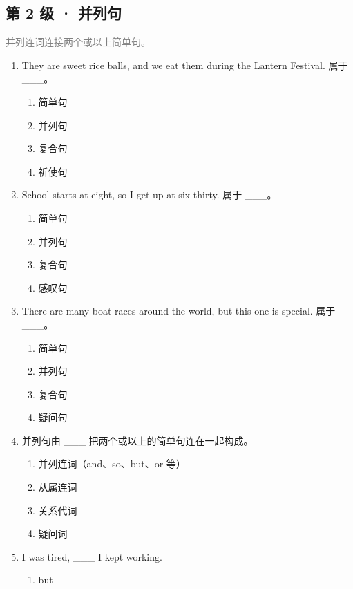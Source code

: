\documentclass[11pt,a4paper]{ctexart}
\begin{document}
\subsection*{第 2 级 · 并列句}
\noindent\textcolor{gray}{并列连词连接两个或以上简单句。}\par\smallskip
\begin{enumerate}[leftmargin=*,itemsep=4pt]
\item They are sweet rice balls, and we eat them during the Lantern Festival. 属于 \_\_\_。
\begin{enumerate}[label=\Alph*.,leftmargin=2em,itemsep=1pt,topsep=2pt]
\item 简单句
\item 并列句
\item 复合句
\item 祈使句
\end{enumerate}
\item School starts at eight, so I get up at six thirty. 属于 \_\_\_。
\begin{enumerate}[label=\Alph*.,leftmargin=2em,itemsep=1pt,topsep=2pt]
\item 简单句
\item 并列句
\item 复合句
\item 感叹句
\end{enumerate}
\item There are many boat races around the world, but this one is special. 属于 \_\_\_。
\begin{enumerate}[label=\Alph*.,leftmargin=2em,itemsep=1pt,topsep=2pt]
\item 简单句
\item 并列句
\item 复合句
\item 疑问句
\end{enumerate}
\item 并列句由 \_\_\_ 把两个或以上的简单句连在一起构成。
\begin{enumerate}[label=\Alph*.,leftmargin=2em,itemsep=1pt,topsep=2pt]
\item 并列连词（and、so、but、or 等）
\item 从属连词
\item 关系代词
\item 疑问词
\end{enumerate}
\item I was tired, \_\_\_ I kept working.
\begin{enumerate}[label=\Alph*.,leftmargin=2em,itemsep=1pt,topsep=2pt]
\item but

\end{enumerate}
\end{enumerate}
\end{document}
